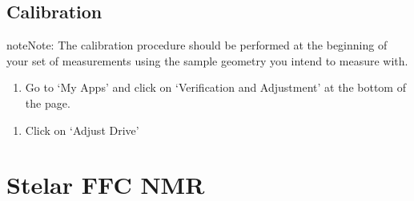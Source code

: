 \documentclass[letterpaper,10pt,english]{sphinxmanual}
\begin{document}
\section{Calibration}
\label{\detokenize{anton-paar:calibration}}
\begin{sphinxadmonition}{note}{Note:}
\sphinxAtStartPar
The calibration procedure should be performed at the beginning of your set of measurements using the sample geometry you intend to measure with.
\end{sphinxadmonition}
\begin{enumerate}
%
\item {} 
\sphinxAtStartPar
Go to ‘My Apps’ and click on ‘Verification and Adjustment’ at the bottom of the page.

\end{enumerate}

\noindent{}
\begin{enumerate}
%
\setcounter{enumi}{1}
\item {} 
\sphinxAtStartPar
Click on ‘Adjust Drive’

\end{enumerate}

\noindent{}


\chapter{Stelar FFC NMR}
\label{\detokenize{stelar-ffc:stelar-ffc-nmr}}\label{\detokenize{stelar-ffc::doc}}
\end{document}
